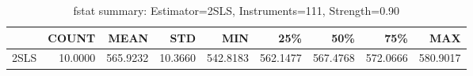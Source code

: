 \begin{table}[ht]
\centering
\caption{fstat summary: Estimator=2SLS, Instruments=111, Strength=0.90}
\begin{tabular}{lrrrrrrrr}
\toprule
 & COUNT & MEAN & STD & MIN & 25\% & 50\% & 75\% & MAX \\
\midrule
2SLS & 10.0000 & 565.9232 & 10.3660 & 542.8183 & 562.1477 & 567.4768 & 572.0666 & 580.9017 \\
\bottomrule
\end{tabular}
\end{table}
